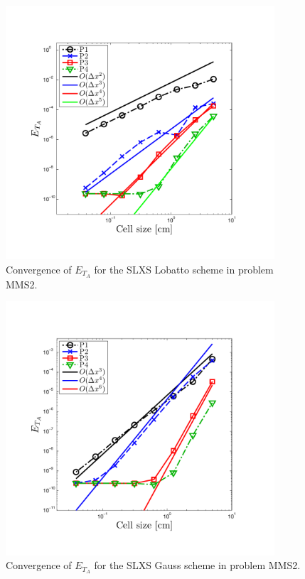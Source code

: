 \begin{figure}[!hbp]
\centering
\includegraphics[width=10cm,trim=0.25in  0.25in 0.75in 0.75in,clip=true]{chapter6_grey_radtran/Dissertation_Data/MMS3_SLXS_Lobatto_temp_A.pdf}
\caption{Convergence of $E_{T_A}$ for the SLXS Lobatto scheme in problem MMS2.}
\label{fig:mms3_slxs_lobatto_t_a}
\end{figure}
%
%
\begin{figure}[!htp]
\centering
\includegraphics[width=10cm,trim=0.25in  0.25in 0.75in 0.75in,clip=true]{chapter6_grey_radtran/Dissertation_Data/MMS3_SLXS_Gauss_temp_A.pdf}
\caption{Convergence of $E_{T_A}$ for the SLXS Gauss scheme in problem MMS2.}
\label{fig:mms3_slxs_gauss_t_a}
\end{figure}

